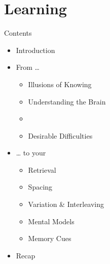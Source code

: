 \documentclass{ercisbeamer}
\begin{document}
\section{Learning}
\begin{frame}{Contents}
    \begin{itemize}
        \item Introduction
        \item From …
        \begin{itemize}
            \item Illusions of Knowing
            \item Understanding the Brain
            \item {}
            \item Desirable Difficulties
        \end{itemize}
        \item … to your 
        \begin{itemize}
            \item Retrieval
            \item Spacing
            \item Variation \& Interleaving
            \item Mental Models
            \item Memory Cues
        \end{itemize}
        \item Recap
    \end{itemize}
\end{frame}
\end{document}
